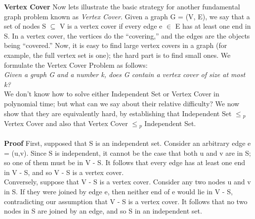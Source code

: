 \documentclass{article}
\begin{document}
\textbf{Vertex Cover} Now lets illustrate the basic strategy for another fundamental graph problem known as \emph{Vertex Cover}. Given a graph G = (V, E), we say that a set of nodes S $\subseteq$ V is a vertex cover if every edge e $\in$ E has at least one end in S. In a vertex cover, the vertices do the “covering,” and the edges are the objects being “covered.” Now, it is easy to find large vertex covers in a graph (for example, the full vertex set is one); the hard part is to find small ones. We formulate the Vertex Cover Problem as follows: \\

\emph{Given a graph G and a number k, does G contain a vertex cover of size at most k?}\\

We don't know how to solve either Independent Set or Vertex Cover in polynomial time; but what can we say about their relative difficulty? We now
show that they are equivalently hard, by establishing that Independent Set $\le$$_p$ Vertex Cover and also that Vertex Cover $\le$$_p$ Independent Set.\\

 \\

\textbf{Proof}
First, supposed that S is an independent set. Consider an arbitrary edge e = (u,v). Since S is independent, it cannot be the case that both u and v are in S; so one of them must be in V - S. It follows that every edge has at least one end in V - S, and so V - S is a vertex cover.\\

Conversely, suppose that V - S is a vertex cover. Consider any two nodes u and v in S. If they were joined by edge e, then neither end of e would lie in V - S, contradicting our assumption that V - S is a vertex cover. It follows that no two nodes in S are joined by an edge, and so S in an independent set.\\

 \\
\end{document}
